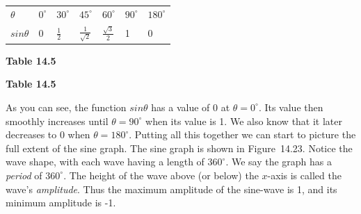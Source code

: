 \begin{table}[H]
\begin{center}
\label{m39414*id84073}
\noindent
{}
\tablelasttail{}
\begin{xtabular}[t]{|l|l|l|l|l|l|l|}\hline
    $\theta $
    &
    ${0}^{\circ }$
    &
    ${30}^{\circ }$
    &
    ${45}^{\circ }$
    &
    ${60}^{\circ }$
    &
    ${90}^{\circ }$
    &
    ${180}^{\circ }$
\tabularnewline{}
    $sin\theta $
    &
0 &
    $\frac{1}{2}$
    &
    $\frac{1}{\sqrt{2}}$
    &
    $\frac{\sqrt{3}}{2}$
    &
1 &
0%
\tabularnewline{}
\end{xtabular}
\end{center}
\begin{center}{\small\bfseries Table 14.5}\end{center}
\begin{caption}{\small\bfseries Table 14.5}\end{caption}
\end{table}
\par
\label{m39414*id84327}As you can see, the function $sin\theta $ has a value of 0 at $\theta ={0}^{\circ }$. Its value then smoothly increases until $\theta ={90}^{\circ }$ when its value is 1. We also know that it later decreases to 0 when $\theta ={180}^{\circ }$. Putting all this together we can start to picture the full extent of the sine graph. The sine graph is shown in Figure~14.23. Notice the wave shape, with each wave having a length of ${360}^{\circ }$. We say the graph has a \textsl{period} of ${360}^{\circ }$. The height of the wave above (or below) the $x$-axis is called the wave's \textsl{amplitude}. Thus the maximum amplitude of the sine-wave is 1, and its minimum amplitude is -1.\par 
\setcounter{subfigure}{0}
